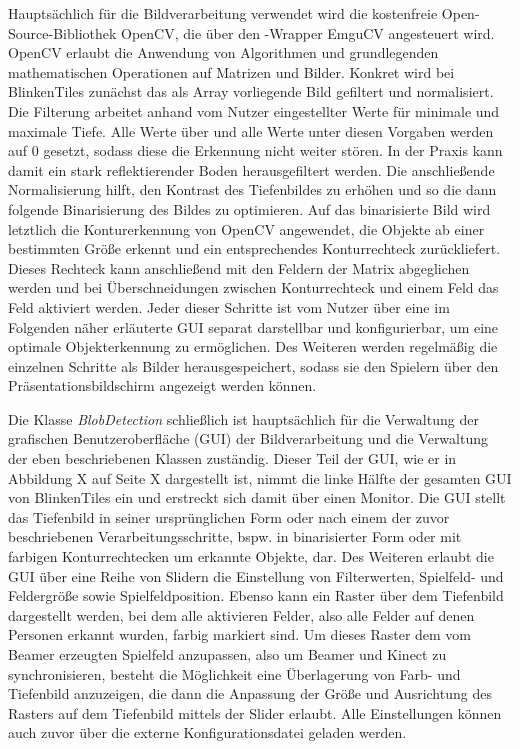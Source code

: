 Hauptsächlich für die Bildverarbeitung verwendet wird die kostenfreie Open-Source-Bibliothek OpenCV, die über den \CS{}-Wrapper EmguCV angesteuert wird. OpenCV erlaubt die Anwendung von Algorithmen und grundlegenden mathematischen Operationen auf Matrizen und Bilder. Konkret wird bei BlinkenTiles zunächst das als Array vorliegende Bild gefiltert und normalisiert. Die Filterung arbeitet anhand vom Nutzer eingestellter Werte für minimale und maximale Tiefe. Alle Werte über und alle Werte unter diesen Vorgaben werden auf 0 gesetzt, sodass diese die Erkennung nicht weiter stören. In der Praxis kann damit ein stark reflektierender Boden herausgefiltert werden. Die anschließende Normalisierung hilft, den Kontrast des Tiefenbildes zu erhöhen und so die dann folgende Binarisierung des Bildes zu optimieren. Auf das binarisierte Bild wird letztlich die Konturerkennung von OpenCV angewendet, die Objekte ab einer bestimmten Größe erkennt und ein entsprechendes Konturrechteck zurückliefert. Dieses Rechteck kann anschließend mit den Feldern der Matrix abgeglichen werden und bei Überschneidungen zwischen Konturrechteck und einem Feld das Feld aktiviert werden. Jeder dieser Schritte ist vom Nutzer über eine im Folgenden näher erläuterte GUI separat darstellbar und konfigurierbar, um eine optimale Objekterkennung zu ermöglichen. Des Weiteren werden regelmäßig die einzelnen Schritte als Bilder herausgespeichert, sodass sie den Spielern über den Präsentationsbildschirm angezeigt werden können.

Die Klasse \emph{BlobDetection} schließlich ist hauptsächlich für die Verwaltung der grafischen Benutzeroberfläche (GUI) der Bildverarbeitung und die Verwaltung der eben beschriebenen Klassen zuständig. Dieser Teil der GUI, wie er in Abbildung X auf Seite X dargestellt ist, nimmt die linke Hälfte der gesamten GUI von BlinkenTiles ein und erstreckt sich damit über einen Monitor. Die GUI stellt das Tiefenbild in seiner ursprünglichen Form oder nach einem der zuvor beschriebenen Verarbeitungsschritte, bspw. in binarisierter Form oder mit farbigen Konturrechtecken um erkannte Objekte, dar. Des Weiteren erlaubt die GUI über eine Reihe von Slidern die Einstellung von Filterwerten, Spielfeld- und Feldergröße sowie Spielfeldposition. Ebenso kann ein Raster über dem Tiefenbild dargestellt werden, bei dem alle aktivieren Felder, also alle Felder auf denen Personen erkannt wurden, farbig markiert sind. Um dieses Raster dem vom Beamer erzeugten Spielfeld anzupassen, also um Beamer und Kinect zu synchronisieren, besteht die Möglichkeit eine Überlagerung von Farb- und Tiefenbild anzuzeigen, die dann die Anpassung der Größe und Ausrichtung des Rasters auf dem Tiefenbild mittels der Slider erlaubt. Alle Einstellungen können auch zuvor über die externe Konfigurationsdatei geladen werden.

